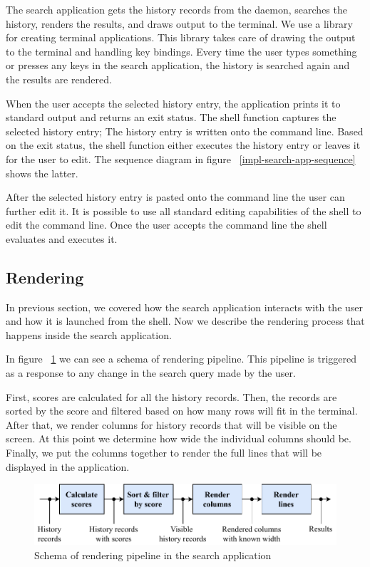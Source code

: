 \documentclass[thesis=M,english]{FITthesis}[2012/10/20]
\newcommand{\tmpframe}[1]{\fbox{#1}}
\renewcommand{\tmpframe}[1]{#1}
\let\myCite\cite
\renewcommand\cite{\unskip~\myCite}
\let\myRef\ref
\renewcommand\ref{\unskip~\myRef}
\begin{document}
The search application gets the history records from the daemon, searches the history, renders the results, and draws output to the terminal. We use a library\cite{lib-gocui} for creating terminal applications. This library takes care of drawing the output to the terminal and handling key bindings. Every time the user types something or presses any keys in the search application, the history is searched again and the results are rendered. 

When the user accepts the selected history entry, the application prints it to standard output and returns an exit status. 
The shell function captures the selected history entry; The history entry is written onto the command line. Based on the exit status, the shell function either executes the history entry or leaves it for the user to edit. The sequence diagram in figure \ref{impl-search-app-sequence} shows the latter. 

After the selected history entry is pasted onto the command line the user can further edit it. 
It is possible to use all standard editing capabilities of the shell to edit the command line.
Once the user accepts the command line the shell evaluates and executes it.




\subsection{Rendering}

In previous section, we covered how the search application interacts with the user and how it is launched from the shell. Now we describe the rendering process that happens inside the search application.


In figure \ref{impl-search-app-render-pipeline} we can see a schema of rendering pipeline. This pipeline is triggered as a response to any change in the search query made by the user. 


First, scores are calculated for all the history records. Then, the records are sorted by the score and filtered based on how many rows will fit in the terminal. After that, we render columns for history records that will be visible on the screen. At this point we determine how wide the individual columns should be. Finally, we put the columns together to render the full lines that will be displayed in the application.


\begin{figure}[h!]
\centering
  \tmpframe{\includegraphics[width=\linewidth]{figures/implementation/thesis-ipml-rendering-pipeline.pdf}}
  \caption{Schema of rendering pipeline in the search application}
  \label{impl-search-app-render-pipeline}
\end{figure}
\end{document}
